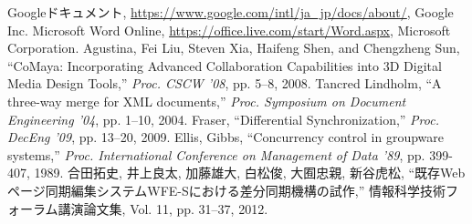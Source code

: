 \renewcommand{\bibname}{参考文献}
\begin{thebibliography}{Longest9}

Googleドキュメント, \url{https://www.google.com/intl/ja_jp/docs/about/}, Google Inc.
Microsoft Word Online, \url{https://office.live.com/start/Word.aspx}, Microsoft Corporation.
Agustina, Fei Liu, Steven Xia, Haifeng Shen, and Chengzheng Sun, ``CoMaya: Incorporating Advanced Collaboration Capabilities into 3D Digital Media Design Tools,'' {\it Proc. CSCW '08}, pp. 5--8, 2008.
Tancred Lindholm, ``A three-way merge for XML documents,'' {\it Proc. Symposium on Document Engineering '04}, pp. 1--10, 2004.
Fraser,	``Differential Synchronization,''  {\it Proc. DecEng '09}, pp. 13--20, 2009.
Ellis, Gibbs, ``Concurrency control in groupware systems,'' {\it Proc. International Conference on Management of Data '89}, pp. 399-407, 1989.
合田拓史, 井上良太, 加藤雄大, 白松俊, 大囿忠親, 新谷虎松, ``既存Webページ同期編集システムWFE-Sにおける差分同期機構の試作,'' 情報科学技術フォーラム講演論文集, Vol. 11, pp. 31--37, 2012.

\end{thebibliography}
